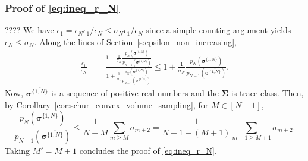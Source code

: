 \documentclass[twoside,11pt]{book}
\begin{document}
\subsubsection{Proof of \eqref{eq:ineq_r_N}}\label{app:proof_ineq_r_N}
????
We have
$\epsilon_{1} = \epsilon_{N}\epsilon_{1}/\epsilon_{N} \leq \sigma_{N} \epsilon_{1}/\epsilon_{N}$ since a simple counting argument yields $ \epsilon_{N} \leq \sigma_{N}$.
Along the lines of Section~\ref{s:epsilon_non_increasing},
\begin{align}
\frac{\epsilon_{1}}{\epsilon_{N}} & = \frac{1  + \frac{1}{\sigma_{N}}\frac{p_{N} \left(\bm{\sigma}^{\overline{\{1,N \}}} \right) }{ p_{N-1} \left(\bm{\sigma}^{\overline{\{1,N \}}} \right)} }{1  + \frac{1}{\sigma_{1} }\frac{p_{N} \left(\bm{\sigma}^{\overline{\{1,N \}}} \right) }{p_{N-1} \left(\bm{\sigma}^{\overline{\{1,N \}}} \right)}}
\leq 1  + \frac{1}{\sigma_{N}}\frac{p_{N} \left(\bm{\sigma}^{\overline{\{1,N \}}} \right) }{ p_{N-1} \left(\bm{\sigma}^{\overline{\{1,N \}}} \right)}.
\end{align}
Now, $\bm{\sigma}^{\overline{\{1,N \}}}$ is a sequence of positive real numbers and the $\bm{\Sigma}$ is trace-class. Then, by Corollary~\ref{cor:schur_convex_volume_sampling}, for $M \in [N-1]$,
\begin{equation}
\frac{p_{N} \left(\bm{\sigma}^{\overline{\{1,N \}}}  \right) }{ p_{N-1} \left(\bm{\sigma}^{\overline{\{1,N \}}}  \right)} \leq \frac{1 }{N-M} \sum_{ m \geq M} \sigma_{m+2} = \frac{1 }{N+1-(M+1)} \sum_{ m+1 \geq M+1} \sigma_{m+2}.
\end{equation}
Taking $M'= M+1$ concludes the proof of \eqref{eq:ineq_r_N}.


\end{document}
